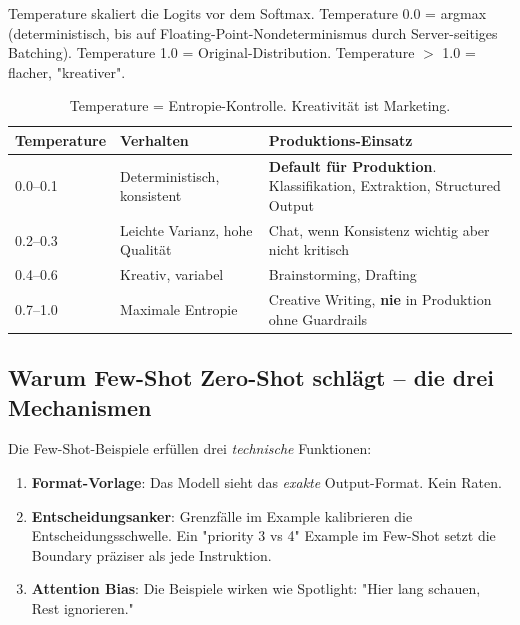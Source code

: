 Temperature skaliert die Logits vor dem Softmax. Temperature 0.0 = argmax (deterministisch, bis auf Floating-Point-Nondeterminismus durch Server-seitiges Batching). Temperature 1.0 = Original-Distribution. Temperature $>$ 1.0 = flacher, "kreativer".

\begin{table}[H]
\centering
\begin{tabularx}{\linewidth}{lXX}
\toprule
\textbf{Temperature} & \textbf{Verhalten} & \textbf{Produktions-Einsatz} \\
\midrule
0.0--0.1 & Deterministisch, konsistent & \textbf{Default für Produktion}. Klassifikation, Extraktion, Structured Output \\
0.2--0.3 & Leichte Varianz, hohe Qualität & Chat, wenn Konsistenz wichtig aber nicht kritisch \\
0.4--0.6 & Kreativ, variabel & Brainstorming, Drafting \\
0.7--1.0 & Maximale Entropie & Creative Writing, \textbf{nie} in Produktion ohne Guardrails \\
\midrule
\end{tabularx}
\caption{Temperature = Entropie-Kontrolle. Kreativität ist Marketing.}
\label{tab:temperature}
\end{table}


\subsection{Warum Few-Shot Zero-Shot schlägt -- die drei Mechanismen}

Die Few-Shot-Beispiele erfüllen drei \textit{technische} Funktionen:

\begin{enumerate}
    \item \textbf{Format-Vorlage}: Das Modell sieht das \textit{exakte} Output-Format. Kein Raten.
    \item \textbf{Entscheidungsanker}: Grenzfälle im Example kalibrieren die Entscheidungsschwelle. Ein "priority 3 vs 4" Example im Few-Shot setzt die Boundary präziser als jede Instruktion.
    \item \textbf{Attention Bias}: Die Beispiele wirken wie Spotlight: "Hier lang schauen, Rest ignorieren."
\end{enumerate}

